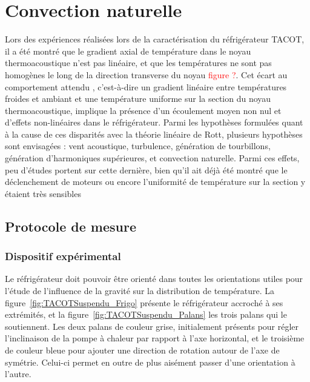 \chapter{Convection naturelle}

Lors des expériences réalisées lors de la caractérisation du réfrigérateur TACOT, il a été montré que le gradient axial de température dans le noyau thermoacoustique n'est pas linéaire, et que les températures ne sont pas homogènes le long de la direction transverse du noyau \textcolor{red}{figure ?}\cite{ramadan_design_2021}. Cet écart au comportement attendu , c'est-à-dire un gradient linéaire entre températures froides et ambiant et une température uniforme sur la section du noyau thermoacoustique, implique la présence d'un écoulement moyen non nul et d'effets non-linéaires dans le réfrigérateur. Parmi les hypothèses formulées quant à la cause de ces disparités avec la théorie linéaire de Rott, plusieurs hypothèses sont envisagées : vent acoustique, turbulence, génération de tourbillons, génération d'harmoniques supérieures, et convection naturelle. Parmi ces effets, peu d'études portent sur cette dernière, bien qu'il ait déjà été montré que le déclenchement de moteurs ou encore l'uniformité de température sur la section y étaient très sensibles \cite{ross_influence_2003,ramadan_experimental_2018,hireche_numerical_2019,zhang_novel_2011}

\section{Protocole de mesure}

\subsection{Dispositif expérimental}

Le réfrigérateur doit pouvoir être orienté dans toutes les orientations utiles pour l'étude de l'influence de la gravité sur la distribution de température. La figure~\ref{fig:TACOTSuspendu_Frigo} présente le réfrigérateur accroché à ses extrémités, et la figure~\ref{fig:TACOTSuspendu_Palans} les trois palans qui le soutiennent. Les deux palans de couleur grise, initialement présents pour régler l'inclinaison de la pompe à chaleur par rapport à l'axe horizontal, et le troisième de couleur bleue pour ajouter une direction de rotation autour de l'axe de symétrie. Celui-ci permet en outre de plus aisément passer d'une orientation à l'autre. 


